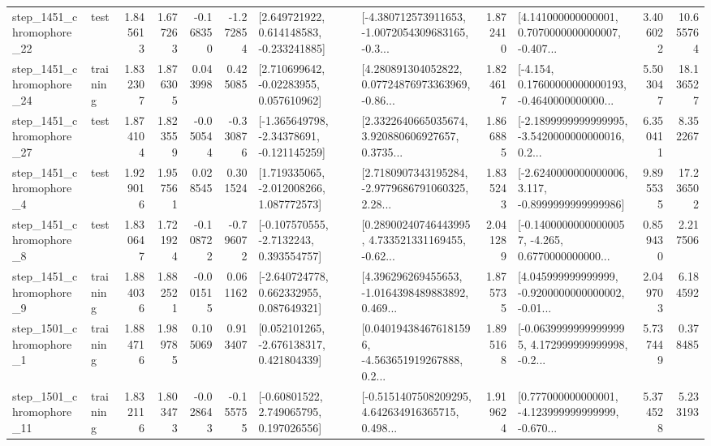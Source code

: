 \begin{tabular}{llrrrrllrlrr}
 step\_1451\_chromophore\_22 &      test &      1.845613 &    1.677263 &     -0.168350 & -1.272854 &    [2.649721922, 0.614148583, -0.233241885] &  [-4.380712573911653, -1.0072054309683165, -0.3... &       1.872410 &  [4.141000000000001, 0.7070000000000007, -0.407... &            3.406022 &         10.655764 \\
 step\_1451\_chromophore\_24 &  training &      1.832307 &    1.876305 &      0.043998 &  0.425085 &     [2.710699642, -0.02283955, 0.057610962] &  [4.280891304052822, 0.07724876973363969, -0.86... &       1.824617 &  [-4.154, 0.17600000000000193, -0.4640000000000... &            5.503047 &         18.136527 \\
 step\_1451\_chromophore\_27 &      test &      1.874104 &    1.823559 &     -0.050544 & -0.330876 &   [-1.365649798, -2.34378691, -0.121145259] &  [2.3322640665035674, 3.920880606927657, 0.3735... &       1.866885 &  [-2.1899999999999995, -3.5420000000000016, 0.2... &            6.350411 &          8.352267 \\
  step\_1451\_chromophore\_4 &      test &      1.929016 &    1.957561 &      0.028545 &  0.301524 &    [1.719335065, -2.012008266, 1.087772573] &  [2.7180907343195284, -2.9779686791060325, 2.28... &       1.835243 &  [-2.6240000000000006, 3.117, -0.8999999999999986] &            9.895535 &         17.236502 \\
  step\_1451\_chromophore\_8 &      test &      1.830647 &    1.721924 &     -0.108722 & -0.796072 &     [-0.107570555, -2.7132243, 0.393554757] &  [0.28900240746443995, 4.733521331169455, -0.62... &       2.041289 &  [-0.14000000000000057, -4.265, 0.6770000000000... &            0.859430 &          2.217506 \\
  step\_1451\_chromophore\_9 &  training &      1.884036 &    1.882521 &     -0.001515 &  0.061162 &    [-2.640724778, 0.662332955, 0.087649321] &  [4.396296269455653, -1.0164398489883892, 0.469... &       1.875735 &  [4.045999999999999, -0.9200000000000002, -0.01... &            2.049703 &          6.184592 \\
  step\_1501\_chromophore\_1 &  training &      1.884716 &    1.989785 &      0.105069 &  0.913407 &    [0.052101265, -2.676138317, 0.421804339] &  [0.040194384676181596, -4.563651919267888, 0.2... &       1.895168 &  [-0.06399999999999995, 4.172999999999998, -0.2... &            5.737449 &          0.378485 \\
 step\_1501\_chromophore\_11 &  training &      1.832116 &    1.803473 &     -0.028643 & -0.155755 &     [-0.60801522, 2.749065795, 0.197026556] &  [-0.5151407508209295, 4.642634916365715, 0.498... &       1.919624 &  [0.777000000000001, -4.123999999999999, -0.670... &            5.374528 &          5.233193 \\

\end{tabular}
